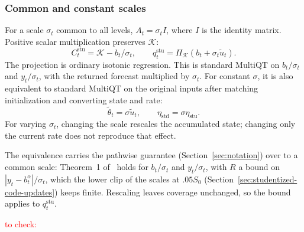 \documentclass[11pt,a4paper]{article}
\newcommand{\K}{\mathcal{K}}
\newcommand{\std}{\mathrm{std}}
\newcommand{\stu}{\mathrm{stu}}
\theoremstyle{definition}
\theoremstyle{remark}
\begin{document}
\subsubsection{Common and constant scales}
\label{sec:common-scales}
For a scale $\sigma_t$ common to all levels, $A_t=\sigma_t I$, where
$I$ is the identity matrix. Positive scalar multiplication preserves $\K$:
\begin{equation}
 C_t^\stu=\K-b_t/\sigma_t,\qquad
 q_t^\stu=\Pi_\K(b_t+\sigma_t\tilde u_t).
 \label{eq:common-scale}
\end{equation}
The projection is ordinary isotonic regression. This is standard
MultiQT on $b_t/\sigma_t$ and $y_t/\sigma_t$, with the returned forecast
multiplied by $\sigma_t$. For constant $\sigma$, it is also equivalent
to standard MultiQT on the original inputs after matching initialization
and converting state and rate:
\begin{equation}
 \tilde\theta_t=\sigma\tilde u_t,\qquad
 \eta_\std=\sigma\eta_\stu.
 \label{eq:constant-common-scale}
\end{equation}
For varying $\sigma_t$, changing the scale rescales the accumulated
state; changing only the current rate does not reproduce that effect.

The equivalence carries the pathwise guarantee
(Section~\ref{sec:notation}) over to a common scale: Theorem~1
of~\cite{multiqt} holds for $b_t/\sigma_t$ and $y_t/\sigma_t$, with $R$
a bound on $|y_t-b_t^\alpha|/\sigma_t$, which the lower clip of the
scales at $.05S_0$ (Section~\ref{sec:studentized-code-updates}) keeps
finite. Rescaling leaves coverage unchanged, so the bound applies to
$q_t^\stu$.

\textcolor{red}{to check:}
\end{document}
